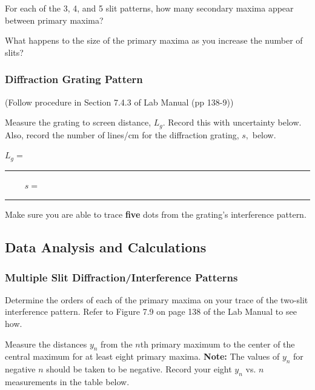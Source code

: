 \noindent 
For each of the 3, 4, and 5 slit patterns, how many secondary maxima
appear between primary maxima?
\vspace*{.5cm}

\noindent
What happens to the size of the primary maxima as you increase the
number of slits?
\vspace*{.5cm}

\subsubsection{Diffraction Grating Pattern}

(Follow procedure in Section 7.4.3 of Lab Manual (pp 138-9))

\noindent
Measure the grating to screen distance, $L_g.$ Record this with
uncertainty below.  Also, record the number of lines/cm for the
diffraction grating, $s,$ below.

\begin{center}
$L_g=$~ \rule{3cm}{.1mm} ~~~~ $s=$~ \rule{3cm}{.1mm}
\end{center}
\vspace*{.5cm}

\noindent
Make sure you are able to trace {\bf five} dots from the grating's
interference pattern.

\newpage

\subsection{Data Analysis and Calculations}

\subsubsection{Multiple Slit Diffraction/Interference Patterns}

Determine the orders of each of the primary maxima on your trace of
the two-slit interference pattern. Refer to Figure 7.9 on page 138 of
the Lab Manual to see how.
\vspace*{.5cm}

\noindent
Measure the distances $y_n$ from the $n$th primary maximum to the
center of the central maximum for at least eight primary maxima. {\bf
Note:} The values of $y_n$ for negative $n$ should be taken to be
negative. Record your eight $y_n$ vs. $n$ measurements in the table
below.

